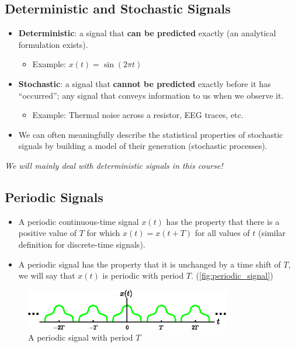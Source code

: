 \subsection{Deterministic and Stochastic Signals}
 \begin{itemize}
    \item \textbf{Deterministic}: a signal that \textbf{can be predicted} exactly (an analytical formulation exists). 
     \begin{itemize}
        \item Example: $x(t) = \sin(2\pi t)$
      \end{itemize}
      
    \item \textbf{Stochastic}: a signal that \textbf{cannot be predicted} exactly before it has “occurred”; any signal that conveys information to us when we observe it. 
      \begin{itemize}
        \item Example: Thermal noise across a resistor, EEG traces, etc.
      \end{itemize}
      
    \item We can often meaningfully describe the statistical properties of stochastic signals by building a model of their generation (stochastic processes).
 \end{itemize}
\textit{We will mainly deal with deterministic signals in this course!}

\subsection{Periodic Signals}
 \begin{itemize}
    \item A periodic continuous-time signal $x(t)$ has the property that there is a positive value of $T$ for which $x(t) = x(t+T)$ for all values of $t$ (similar definition for discrete-time signals).
    
    \item A periodic signal has the property that it is unchanged by a time shift of $T$, we will say that $x(t)$ is periodic with period $T$. (\autoref{fig:periodic_signal})
 \end{itemize}
 \begin{figure}[H]\centering
    \includegraphics[width = 0.8\textwidth]{images/periodic_signal.eps}
    \caption{A periodic signal with period $T$}
    \label{fig:periodic_signal}
 \end{figure}

